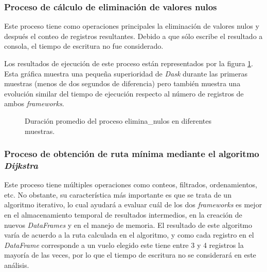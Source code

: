 \subsubsection{Proceso de cálculo de eliminación de valores nulos}

Este proceso tiene como operaciones principales la eliminación de valores nulos y después el conteo de registros resultantes. Debido a que sólo escribe el resultado a consola, el tiempo de escritura no fue considerado.

Los resultados de ejecución de este proceso están representados por la figura \ref{lineas:local-elimina-nulos}. Esta gráfica muestra una pequeña superioridad de \textit{Dask} durante las primeras muestras (menos de dos segundos de diferencia) pero también muestra una evolución similar del tiempo de ejecución respecto al número de registros de ambos \textit{frameworks}. 

\begin{figure}
\centering
{}
\caption{Duración promedio del proceso elimina\_nulos en diferentes muestras.}
\label{lineas:local-elimina-nulos}
\end{figure}

\subsubsection{Proceso de obtención de ruta mínima mediante el algoritmo \textit{Dijkstra}}

Este proceso tiene múltiples operaciones como conteos, filtrados, ordenamientos, etc. No obstante, su característica más importante es que se trata de un algoritmo iterativo, lo cual ayudará a evaluar cuál de los dos \textit{frameworks} es mejor en el almacenamiento temporal de resultados intermedios, en la creación de nuevos \textit{DataFrames} y en el manejo de memoria. El resultado de este algoritmo varía de acuerdo a la ruta calculada en el algoritmo, y como cada registro en el \textit{DataFrame} corresponde a un vuelo elegido este tiene entre 3 y 4 registros la mayoría de las veces, por lo que el tiempo de escritura no se considerará en este análisis.

